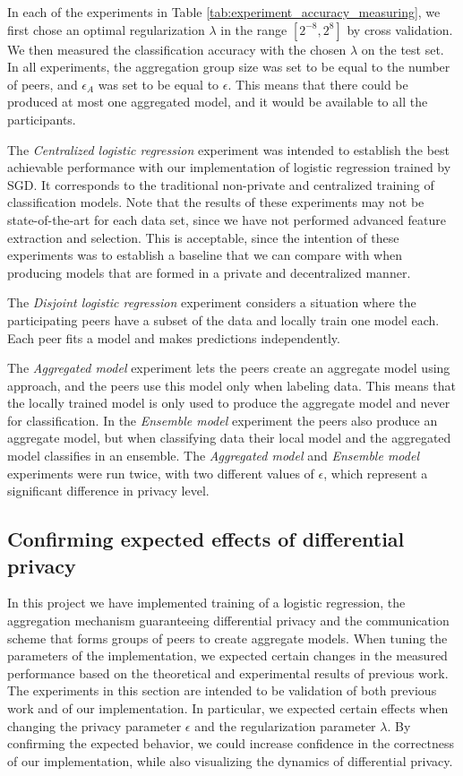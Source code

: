 In each of the experiments in Table \ref{tab:experiment_accuracy_measuring}, we first chose an optimal regularization $\lambda$ in the range $[2^{-8}, 2^8]$ by cross validation. We then measured the classification accuracy with the chosen $\lambda$ on the test set. In all experiments, the aggregation group size was set to be equal to the number of peers, and $\epsilon_{A}$ was set to be equal to $\epsilon$. This means that there could be produced at most one aggregated model, and it would be available to all the participants.

The \textit{Centralized logistic regression} experiment was intended to establish the best achievable performance with our implementation of logistic regression trained by SGD. It corresponds to the traditional non-private and centralized training of classification models. Note that the results of these experiments may not be state-of-the-art for each data set, since we have not performed advanced feature extraction and selection. This is acceptable, since the intention of these experiments was to establish a baseline that we can compare with when producing models that are formed in a private and decentralized manner. 

The \textit{Disjoint logistic regression} experiment considers a situation where the participating peers have a subset of the data and locally train one model each. Each peer fits a model and makes predictions independently.

The \textit{Aggregated model} experiment lets the peers create an aggregate model using \cite{pathak2010diffprivhomo} approach, and the peers use this model only when labeling data. This means that the locally trained model is only used to produce the aggregate model and never for classification. In the \textit{Ensemble model} experiment the peers also produce an aggregate model, but when classifying data their local model and the aggregated model classifies in an ensemble. The \textit{Aggregated model} and \textit{Ensemble model} experiments were run twice, with two different values of $\epsilon$, which represent a significant difference in privacy level.

\subsection{Confirming expected effects of differential privacy}

In this project we have implemented training of a logistic regression, the aggregation mechanism guaranteeing differential privacy and the communication scheme that forms groups of peers to create aggregate models. When tuning the parameters of the implementation, we expected certain changes in the measured performance based on the theoretical and experimental results of previous work. The experiments in this section are intended to be validation of both previous work and of our implementation. In particular, we expected certain effects when changing the privacy parameter $\epsilon$ and the regularization parameter $\lambda$. By confirming the expected behavior, we could increase confidence in the correctness of our implementation, while also visualizing the dynamics of differential privacy.

